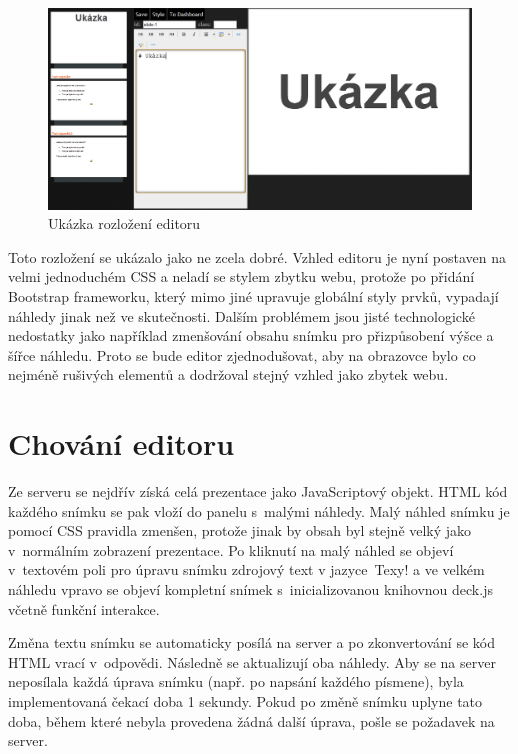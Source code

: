 \documentclass[11pt,twoside,a4paper]{book}
\begin{document}
\begin{figure}[ht]
	\begin{center}
		\includegraphics[width=14cm]{PRO-img/editor.png}
		\caption{Ukázka rozložení editoru}
		\label{fig:editorLayout}
	\end{center}
\end{figure}

Toto rozložení se ukázalo jako ne zcela dobré. Vzhled editoru je nyní postaven na velmi jednoduchém CSS a neladí se
stylem zbytku webu, protože po přidání Bootstrap frameworku, který mimo jiné upravuje globální styly prvků, vypadají
náhledy jinak než ve skutečnosti. Dalším problémem jsou jisté technologické nedostatky jako například zmenšování obsahu
snímku pro přizpůsobení výšce a šířce náhledu. Proto se bude editor zjednodušovat, aby na obrazovce bylo co nejméně
rušivých elementů a dodržoval stejný vzhled jako zbytek webu.


\section[Chování editoru]{Chování editoru}
Ze serveru se nejdřív získá celá prezentace jako JavaScriptový objekt. HTML kód každého snímku se pak vloží do panelu
s~malými náhledy. Malý náhled snímku je pomocí CSS pravidla zmenšen, protože jinak by obsah byl stejně velký jako
v~normálním zobrazení prezentace. Po kliknutí na malý náhled se objeví v~textovém poli pro úpravu snímku zdrojový text
v jazyce~Texy! a ve velkém náhledu vpravo se objeví kompletní snímek s~inicializovanou knihovnou deck.js včetně funkční
interakce.

Změna textu snímku se automaticky posílá na server a po zkonvertování se kód HTML vrací v~odpovědi. Následně se
aktualizují oba náhledy. Aby se na server neposílala každá úprava snímku (např. po napsání každého písmene), byla
implementovaná čekací doba 1 sekundy. Pokud po změně snímku uplyne tato doba, během které nebyla provedena žádná další
úprava, pošle se požadavek na server.
\end{document}

